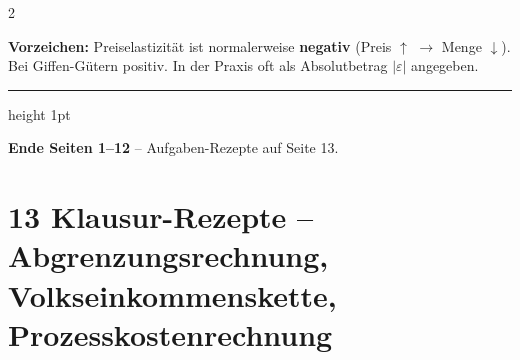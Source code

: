 \documentclass[10pt,a4paper]{article}
\begin{document}
\begin{multicols}{2}
\begin{hinweisbox}
\textbf{Vorzeichen:} Preiselastizität ist normalerweise \textbf{negativ} (Preis $\uparrow$ $\to$ Menge $\downarrow$). Bei Giffen-Gütern positiv. In der Praxis oft als Absolutbetrag $|\varepsilon|$ angegeben.
\end{hinweisbox}

\end{multicols}

\vspace{6pt}
{\color{bwlblue}\hrule height 1pt}
\vspace{3pt}
{\small\centering\textbf{Ende Seiten 1--12} -- Aufgaben-Rezepte auf Seite 13.}

\newpage

\section{13 \quad Klausur-Rezepte -- Abgrenzungsrechnung, Volkseinkommenskette, Prozesskostenrechnung}
\end{document}
